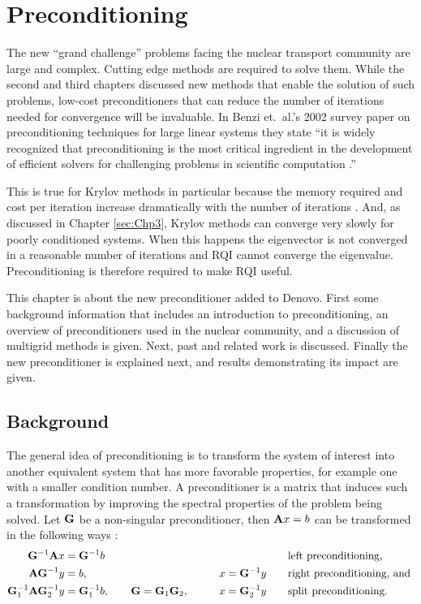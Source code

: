 
\chapter{Preconditioning}
\label{sec:Chp4}
The new ``grand challenge'' problems facing the nuclear transport community are large and complex. Cutting edge methods are required to solve them. While the second and third chapters discussed new methods that enable the solution of such problems, low-cost preconditioners that can reduce the number of iterations needed for convergence will be invaluable. In Benzi et.\ al.'s 2002 survey paper on preconditioning techniques for large linear systems they state ``it is widely recognized that preconditioning is the most critical ingredient in the development of efficient solvers for challenging problems in scientific computation \cite{Benzi2002}.'' 

This is true for Krylov methods in particular because the memory required and cost per iteration increase dramatically with the number of iterations \cite{Benzi2002}. And, as discussed in Chapter \ref{sec:Chp3}, Krylov methods can converge very slowly for poorly conditioned systems. When this happens the eigenvector is not converged in a reasonable number of iterations and RQI cannot converge the eigenvalue. Preconditioning is therefore required to make RQI useful. 

This chapter is about the new preconditioner added to Denovo. First some background information that includes an introduction to preconditioning, an overview of preconditioners used in the nuclear community, and a discussion of multigrid methods is given. Next, past and related work is discussed. Finally the new preconditioner is explained next, and results demonstrating its impact are given. 

\section{Background}
The general idea of preconditioning is to transform the system of interest into another equivalent system that has more favorable properties, for example one with a smaller condition number. A preconditioner is a matrix that induces such a transformation by improving the spectral properties of the problem being solved. Let $\mathbf{G}$ be a non-singular preconditioner, then $\mathbf{A}x=b$ can be transformed in the following ways \cite{Benzi2002}: 
%
\begin{alignat}{3}
  \mathbf{G}^{-1}\mathbf{A}x &= \mathbf{G}^{-1}b  &  &\text{left preconditioning,} \\
  \mathbf{AG}^{-1}y &= b, \qquad  &x = \mathbf{G}^{-1}y \qquad &\text{right preconditioning, and } \\
  \mathbf{G}_{1}^{-1}\mathbf{AG}_{2}^{-1}y &= \mathbf{G}_{1}^{-1}b, \qquad \mathbf{G} = \mathbf{G}_{1}\mathbf{G}_{2}, \qquad  &x = \mathbf{G}_{2}^{-1}y  \qquad &\text{split preconditioning.} 
\end{alignat}


